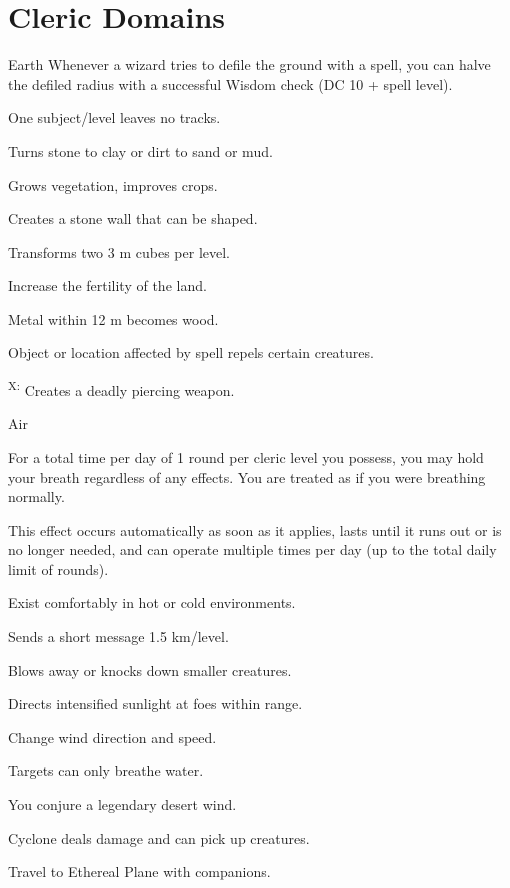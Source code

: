 \section{Cleric Domains}

{Earth}
{Whenever a wizard tries to defile the ground with a spell, you can halve the defiled radius with a successful Wisdom check (DC 10 + spell level).}
{
	\item {} One subject/level leaves no tracks.
	\item {} Turns stone to clay or dirt to sand or mud.
	\item {} Grows vegetation, improves crops.
	\item {} Creates a stone wall that can be shaped.
	\item {} Transforms two 3 m cubes per level.
	\item {} Increase the fertility of the land.
	\item {} Metal within 12 m becomes wood.
	\item {} Object or location affected by spell repels certain creatures.
	\item {}\textsuperscript{X:} Creates a deadly piercing weapon.
}

{Air}
{For a total time per day of 1 round per cleric level you possess, you may hold your breath regardless of any effects. You are treated as if you were breathing normally.

This effect occurs automatically as soon as it applies, lasts until it runs out or is no longer needed, and can operate multiple times per day (up to the total daily limit of rounds).}
{
	\item {} Exist comfortably in hot or cold environments.
	\item {} Sends a short message 1.5 km/level.
	\item {} Blows away or knocks down smaller creatures.
	\item {} Directs intensified sunlight at foes within range.
	\item {} Change wind direction and speed.
	\item {} Targets can only breathe water.
	\item {} You conjure a legendary desert wind.
	\item {} Cyclone deals damage and can pick up creatures.
	\item {} Travel to Ethereal Plane with companions.
}

